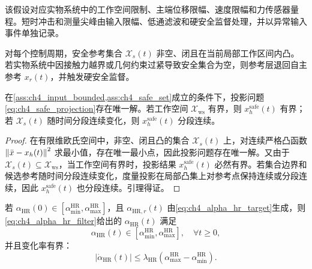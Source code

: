 该假设对应实物系统中的工作空间限制、主端位移限幅、速度限幅和力传感器量程。短时冲击和测量尖峰由输入限幅、低通滤波和硬安全监督处理，并以异常输入事件单独记录。

\begin{assumption}[安全集合非空与局部凸性]
\label{ass:ch4_safe_set}
对每个控制周期，安全参考集合 $\mathcal X_s(t)$ 非空、闭且在当前局部工作区间内凸。若实物系统中因接触力越界或几何约束过紧导致安全集合为空，则参考层退回自主参考 $x_r(t)$，并触发硬安全监督。
\end{assumption}

\begin{lemma}[安全参考投影的存在性与有界性]
\label{lem:ch4_projection_bounded}
在\cref{ass:ch4_input_bounded,ass:ch4_safe_set}成立的条件下，投影问题\eqref{eq:ch4_safe_projection}存在唯一解。若工作空间 $\mathcal X_{\mathrm{ws}}$ 有界，则 $x_h^{\mathrm{safe}}(t)$ 有界；若 $\mathcal X_s(t)$ 随时间分段连续变化，则 $x_h^{\mathrm{safe}}(t)$ 分段连续。
\end{lemma}

\begin{proof}
在有限维欧氏空间中，非空、闭且凸的集合 $\mathcal X_s(t)$ 上，对连续严格凸函数 $\left\lVert \bar x-x_h(t)\right\rVert^2$ 求最小值，存在唯一最小点，因此投影问题存在唯一解。又由于 $\mathcal X_s(t)\subseteq\mathcal X_{\mathrm{ws}}$，当工作空间有界时，投影结果 $x_h^{\mathrm{safe}}(t)$ 必然有界。若集合边界和候选参考随时间分段连续变化，度量投影在局部凸集上对参考点保持连续或分段连续，因此 $x_h^{\mathrm{safe}}(t)$ 也分段连续。引理得证。
\end{proof}

\begin{lemma}[人机仲裁权重的区间不变性]
\label{lem:ch4_alpha_hr_invariance}
若 $\alpha_{\mathrm{HR}}(0)\in[\alpha_{\min}^{\mathrm{HR}},\alpha_{\max}^{\mathrm{HR}}]$，且 $\alpha_{\mathrm{HR},r}(t)$ 由\eqref{eq:ch4_alpha_hr_target}生成，则\eqref{eq:ch4_alpha_hr_filter}给出的 $\alpha_{\mathrm{HR}}(t)$ 满足
\begin{equation}
  \alpha_{\mathrm{HR}}(t)\in
  [\alpha_{\min}^{\mathrm{HR}},\alpha_{\max}^{\mathrm{HR}}],
  \quad \forall t\ge0,
  \label{eq:ch4_alpha_hr_interval}
\end{equation}
并且变化率有界：
\begin{equation}
  |\dot\alpha_{\mathrm{HR}}(t)|
  \le
  \lambda_{\mathrm{HR}}
  \left(\alpha_{\max}^{\mathrm{HR}}-\alpha_{\min}^{\mathrm{HR}}\right).
  \label{eq:ch4_alpha_hr_rate}
\end{equation}
\end{lemma}


